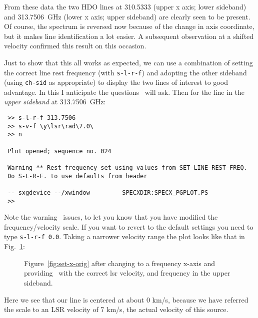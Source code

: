From these data the two HDO lines at 310.5333 (upper x axis; lower
sideband) and 313.7506~GHz (lower x axis; upper sideband) are clearly
seen to be present. Of course, the spectrum is reversed now because of
the change in axis coordinate, but it makes line identification a lot
easier. A subsequent observation at a shifted velocity confirmed this
result on this occasion.

Just to show that this all works as expected, we can use a combination
of setting the correct line rest frequency (with {\tt s-l-r-f}) and
adopting the other sideband (using {\tt ch-sid} as appropriate) to display
the two
lines of interest to good advantage. In this I anticipate the
questions \SPECX\ will ask. Then for the line in the {\it upper sideband}
at
313.7506~GHz:
\begin{verbatim}
 >> s-l-r-f 313.7506
 >> s-v-f \y\lsr\rad\7.0\ 
 >> n
 
 Plot opened; sequence no. 024
 
 Warning ** Rest frequency set using values from SET-LINE-REST-FREQ.
 Do S-L-R-F. to use defaults from header
 
 -- sxgdevice --/xwindow         SPECXDIR:SPECX_PGPLOT.PS
 >> 
\end{verbatim} 

Note the warning \SPECX\ issues, to let you know that you have
modified the frequency/velocity scale. If you want to revert to the
default settings you need to type \verb|s-l-r-f 0.0|. Taking a
narrower velocity range the plot looks like that in Fig.~\ref{fig:set-to-usb}:

\begin{figure}[ht]
\begin{minipage}[t]{\textwidth}
\begin{minipage}[b]{0.5\textwidth}
\leavevmode
\centering
\epsfxsize=2.3in
\end{minipage}
\hfill
\begin{minipage}[b]{0.45\textwidth}
\caption[Part of the same in the USB]
{\small{Figure~\ref{fig:set-x-orig} after changing to a frequency
x-axis and providing \SPECX\ with the correct lsr velocity, and
frequency in the upper sideband.
\vspace*{1cm}
}}
\label{fig:set-to-usb}
\end{minipage}
\end{minipage}
\end{figure}
   
Here we see that our line is centered at about 0 km/s, because we have
referred the scale to an LSR velocity of 7 km/s, the actual velocity of
this source.

